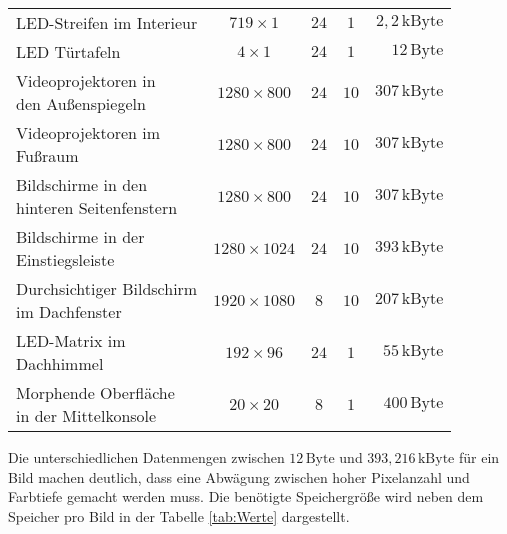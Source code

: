 \begin{table}[hbt]
\begin{tabular}{l|cccr}
		\parbox[t]{0.3\linewidth}{\RaggedRight LED-Streifen im Interieur} & $ 719 \times 1 $ & $ 24 $ & $ 1 $ & $ 2,2\,\mathrm{kByte} $ \\
		\parbox[t]{0.3\linewidth}{\RaggedRight LED Türtafeln} & $ 4 \times 1 $ & $ 24 $ & $ 1 $ &  $ 12\,\mathrm{Byte} $ \\
		\parbox[t]{0.3\linewidth}{\RaggedRight Videoprojektoren in\\den Außenspiegeln} & $ 1280 \times 800 $ & $ 24 $ & $ 10 $ &   $ 307\,\mathrm{kByte} $ \\ 
		\parbox[t]{0.3\linewidth}{\RaggedRight Videoprojektoren im\\ Fußraum} & $ 1280 \times 800 $ & $ 24 $ & $ 10 $ & $ 307\,\mathrm{kByte} $ \\
		\parbox[t]{0.3\linewidth}{\RaggedRight Bildschirme in den\\hinteren Seitenfenstern} & $ 1280 \times 800 $ & $ 24 $ & $ 10 $ & $ 307\,\mathrm{kByte} $ \\
		\parbox[t]{0.3\linewidth}{\RaggedRight Bildschirme in der\\ Einstiegsleiste} &  $ 1280 \times 1024 $ & $ 24 $ & $ 10 $ & $ 393\,\mathrm{kByte} $ \\
		\parbox[t]{0.3\linewidth}{\RaggedRight Durchsichtiger Bildschirm\\im Dachfenster} & $ 1920 \times 1080 $ & $ 8 $ & $ 10 $ & $ 207\,\mathrm{kByte} $ \\
		\parbox[t]{0.3\linewidth}{\RaggedRight LED-Matrix im\\ Dachhimmel} & $ 192 \times 96 $ & $ 24 $ & $ 1 $ & $ 55\,\mathrm{kByte} $ \\
		\parbox[t]{0.3\linewidth}{\RaggedRight Morphende Oberfläche\\in der Mittelkonsole} & $ 20 \times 20 $ & $ 8 $ & $ 1 $ & $ 400\,\mathrm{Byte} $ \\
	\end{tabular} 
\end{table}
Die unterschiedlichen Datenmengen zwischen $ 12\,\mathrm{Byte} $ und $ 393,216\,\mathrm{kByte} $ für ein Bild machen deutlich, dass eine Abwägung zwischen hoher Pixelanzahl und Farbtiefe gemacht werden muss. Die benötigte Speichergröße wird neben dem Speicher pro Bild in der Tabelle \ref{tab:Werte} dargestellt. 
